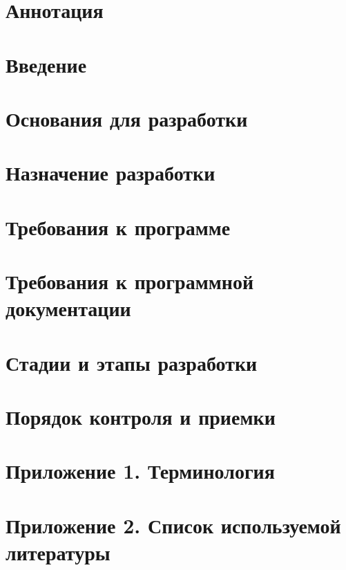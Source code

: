 \documentclass[
encoding=utf8
]{twoeskd}
\begin{document}
	
	\section{Аннотация}
	
	
	\newpage
	\tableofcontents
	
	
	\newpage
	\section{Введение}
	
	
	\newpage
	\section{Основания для разработки}
	
	
	\newpage
	\section{Назначение разработки}
	
	
	\newpage
	\section{Требования к программе}
	
	
	\newpage
	\section{Требования к программной документации}
	
	
	\newpage
	\section{Стадии и этапы разработки}
	
	
	\newpage
	\section{Порядок контроля и приемки}
	
	
	\newpage
	\section{Приложение 1. Терминология}
	
	
	\newpage
	\section{Приложение 2. Список используемой литературы}
	
	
	\newpage
	\eskdListOfChanges
\end{document}
